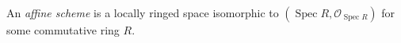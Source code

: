 
An \emph{affine scheme} is a locally ringed space isomorphic to $(\operatorname{Spec}R,\mathcal O_{\operatorname{Spec}R})$ for some commutative ring $R$.
